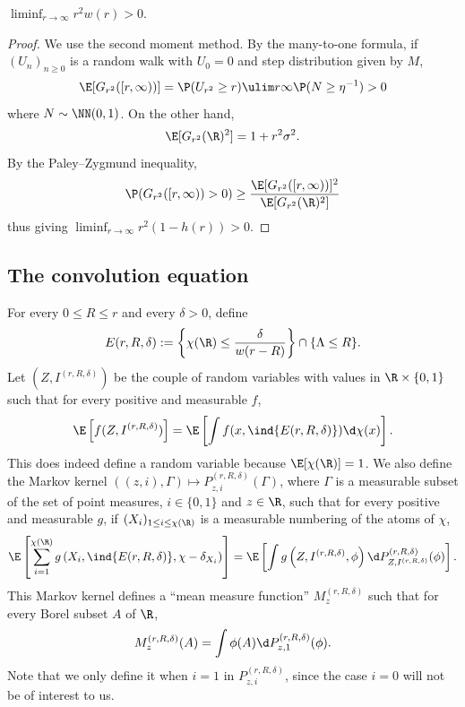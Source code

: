 \documentclass[10pt,a4paper]{article}
\begin{document}
\begin{lemma}\label{lem:lower-bound-w}
$\liminf_{r\to\infty} r^2 w(r) > 0 .$
\end{lemma}

\begin{proof}
We use the second moment method. By the many-to-one formula, if $(U_n)_{n\geq 0}$ is a random walk with $U_0=0$ and step distribution given by $M$, 
\[ \E[G_{r^2}([r, \infty))] = \P(U_{r^2} \geq r) \ulim r \infty \P( N \geq \eta^{-1} ) > 0 \]
where $N\sim\NN(0,1)$. On the other hand, 
\[ \E[G_{r^2}(\R)^2] = 1 + r^2\sigma^2 . \]
By the Paley--Zygmund inequality,
\[ \P(G_{r^2}([r,\infty)) > 0) \geq \frac{\E[G_{r^2}([r, \infty))]^2}{\E[G_{r^2}(\R)^2]} \]
thus giving $\liminf_{r\to\infty} r^2(1-h(r)) > 0 $. 
\end{proof}







\subsection{The convolution equation}


For every $0\leq R \leq r$ and every $\delta>0$, define 
\begin{equation}\label{eq:event-E-rRd}
E(r,R,\delta) := \left\{\chi(\R)\leq \frac{\delta}{w(r-R)} \right\} \cap \{ \Lambda \leq R \} .
\end{equation} 
Let $(Z, I^{(r,R,\delta)})$ be the couple of random variables with values in $\R\times \{0,1\}$ such that for every positive and measurable $f$, 
\begin{equation}\label{eq:def-ZI}
\E\left[ f(Z, I^{(r,R,\delta)}) \right] = \E\left[ \int f(x,\ind{E(r,R,\delta)}) \d\chi(x) \right] .
\end{equation}
This does indeed define a random variable because $\E[\chi(\R)]=1$. We also define the Markov kernel $((z,i), \Gamma) \mapsto P^{(r,R,\delta)}_{z,i}(\Gamma)$, where $\Gamma$ is a measurable subset of the set of point measures, $i\in\{0,1\}$ and $z\in\R$, such that for every positive and measurable $g$, if $(X_i)_{1\leq i \leq \chi(\R)}$ is a measurable numbering of the atoms of $\chi$, 
\begin{equation}\label{eq:def-Palm}
\E\left[ \sum_{i=1}^{\chi(\R)} g\left(X_i , \ind{E(r,R,\delta)}, \chi - \delta_{X_i} \right) \right] = \E\left[ \int g\left(Z, I^{(r,R,\delta)}, \phi \right) \d P^{(r,R,\delta)}_{Z, I^{(r,R,\delta)}}(\phi) \right] .
\end{equation} 
This Markov kernel defines a ``mean measure function'' $M^{(r,R,\delta)}_{z}$ such that for every Borel subset $A$ of $\R$, 
\begin{equation}\label{eq:def-Palm-mean}
M^{(r,R,\delta)}_{z}(A) = \int \phi(A) \d P^{(r,R,\delta)}_{z,1}(\phi) . 
\end{equation}
Note that we only define it when $i=1$ in $P^{(r,R,\delta)}_{z,i}$, since the case $i=0$ will not be of interest to us. 
\end{document}
